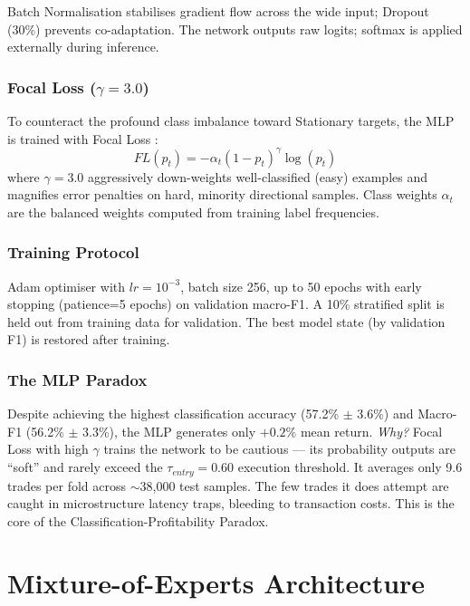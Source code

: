 \documentclass[conference]{IEEEtran}
\begin{document}
Batch Normalisation stabilises gradient flow across the wide input;
Dropout (30\%) prevents co-adaptation. The network outputs raw logits;
softmax is applied externally during inference.

\subsubsection{Focal Loss ($\gamma=3.0$)}
To counteract the profound class imbalance toward Stationary targets,
the MLP is trained with Focal Loss \cite{b2}:
\begin{equation}
    FL(p_t) = -\alpha_t (1 - p_t)^\gamma \log(p_t)
\end{equation}
where $\gamma=3.0$ aggressively down-weights well-classified (easy)
examples and magnifies error penalties on hard, minority directional
samples. Class weights $\alpha_t$ are the balanced weights computed from
training label frequencies.

\subsubsection{Training Protocol}
Adam optimiser with $lr=10^{-3}$, batch size 256, up to 50 epochs with
early stopping (patience=5 epochs) on validation macro-F1. A 10\%
stratified split is held out from training data for validation. The best
model state (by validation F1) is restored after training.

\subsubsection{The MLP Paradox}
Despite achieving the highest classification accuracy (57.2\% $\pm$ 3.6\%)
and Macro-F1 (56.2\% $\pm$ 3.3\%), the MLP generates only $+0.2\%$ mean
return. \textit{Why?} Focal Loss with high $\gamma$ trains the network
to be cautious --- its probability outputs are ``soft'' and rarely exceed
the $\tau_{entry}=0.60$ execution threshold. It averages only 9.6 trades
per fold across $\sim$38,000 test samples. The few trades it does attempt
are caught in microstructure latency traps, bleeding to transaction costs.
This is the core of the Classification-Profitability Paradox.

\section{Mixture-of-Experts Architecture}
\end{document}
